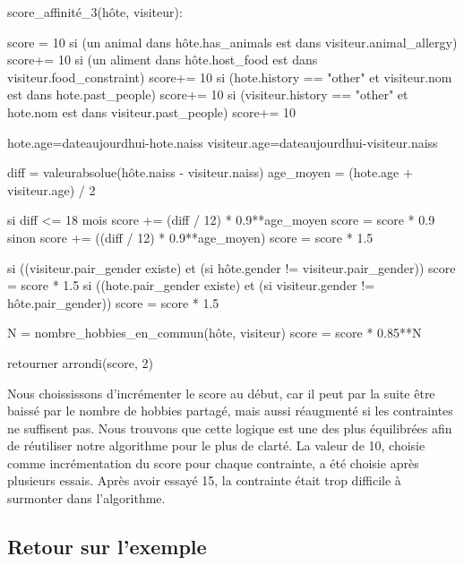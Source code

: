 \documentclass{mytex}
\begin{document}
\begin{codebox}
score_affinité_3(hôte, visiteur):

    score = 10
    si (un animal dans hôte.has_animals est dans visiteur.animal_allergy) score+= 10
    si (un aliment dans hôte.host_food est dans visiteur.food_constraint) score+= 10
    si (hote.history == "other" et visiteur.nom est dans hote.past_people) score+= 10
    si (visiteur.history == "other" et hote.nom est dans visiteur.past_people) score+= 10
    
    hote.age=dateaujourdhui-hote.naiss
    visiteur.age=dateaujourdhui-visiteur.naiss

    diff = valeurabsolue(hôte.naiss - visiteur.naiss) 
    age_moyen = (hote.age + visiteur.age) / 2

    si diff <= 18 mois
        score += (diff / 12) * 0.9**age_moyen
	    score = score * 0.9
    sinon 
        score += ((diff / 12) * 0.9**age_moyen) 
	    score = score * 1.5

    si ((visiteur.pair_gender existe) et (si hôte.gender != visiteur.pair_gender))
	        score = score * 1.5
    si ((hote.pair_gender existe) et (si visiteur.gender != hôte.pair_gender))
	        score = score * 1.5

    N = nombre_hobbies_en_commun(hôte, visiteur)
        score = score * 0.85**N

    retourner arrondi(score, 2)
\end{codebox}


Nous choississons d'incrémenter le score au début, car il peut par la suite être baissé par le nombre de hobbies partagé, mais aussi réaugmenté si les contraintes ne suffisent pas. Nous trouvons que cette logique est une des plus équilibrées afin de réutiliser notre algorithme pour le plus de clarté.
La valeur de 10, choisie comme incrémentation du score pour chaque contrainte, a été choisie après plusieurs essais. Après avoir essayé 15, la contrainte était trop difficile à surmonter dans l'algorithme.


\subsection{Retour sur l'exemple}
\end{document}
